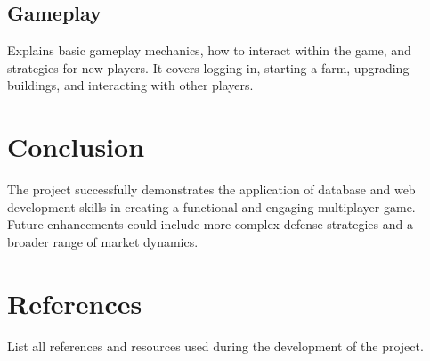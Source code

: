 \documentclass[12pt]{article}
\begin{document}
\subsection{Gameplay}
Explains basic gameplay mechanics, how to interact within the game, and strategies for new players. It covers logging in, starting a farm, upgrading buildings, and interacting with other players.

\section{Conclusion}
The project successfully demonstrates the application of database and web development skills in creating a functional and engaging multiplayer game. Future enhancements could include more complex defense strategies and a broader range of market dynamics.

\section{References}
List all references and resources used during the development of the project.
\end{document}
